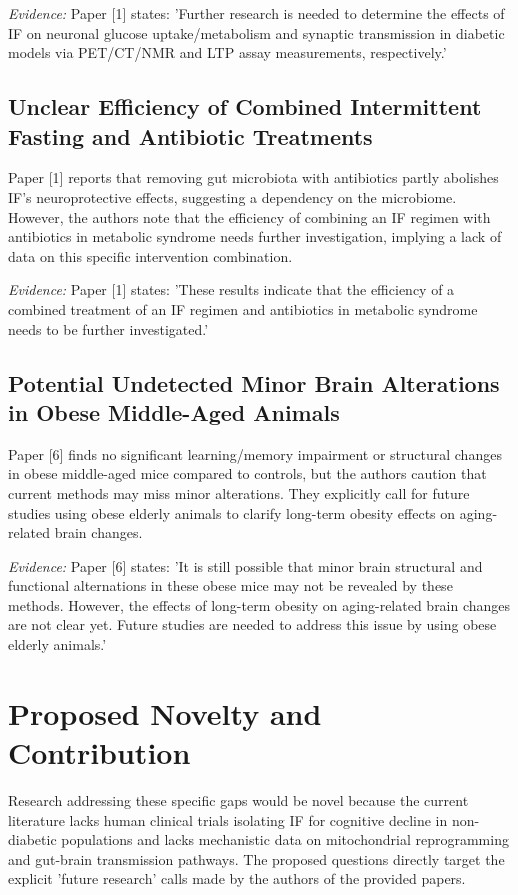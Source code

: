 \documentclass[11pt]{article}
\begin{document}
\textit{Evidence:} Paper [1] states: 'Further research is needed to determine the effects of IF on neuronal glucose uptake/metabolism and synaptic transmission in diabetic models via PET/CT/NMR and LTP assay measurements, respectively.'

\subsection{Unclear Efficiency of Combined Intermittent Fasting and Antibiotic Treatments}
Paper [1] reports that removing gut microbiota with antibiotics partly abolishes IF's neuroprotective effects, suggesting a dependency on the microbiome. However, the authors note that the efficiency of combining an IF regimen with antibiotics in metabolic syndrome needs further investigation, implying a lack of data on this specific intervention combination.

\textit{Evidence:} Paper [1] states: 'These results indicate that the efficiency of a combined treatment of an IF regimen and antibiotics in metabolic syndrome needs to be further investigated.'

\subsection{Potential Undetected Minor Brain Alterations in Obese Middle-Aged Animals}
Paper [6] finds no significant learning/memory impairment or structural changes in obese middle-aged mice compared to controls, but the authors caution that current methods may miss minor alterations. They explicitly call for future studies using obese elderly animals to clarify long-term obesity effects on aging-related brain changes.

\textit{Evidence:} Paper [6] states: 'It is still possible that minor brain structural and functional alternations in these obese mice may not be revealed by these methods. However, the effects of long-term obesity on aging-related brain changes are not clear yet. Future studies are needed to address this issue by using obese elderly animals.'

\section{Proposed Novelty and Contribution}
Research addressing these specific gaps would be novel because the current literature lacks human clinical trials isolating IF for cognitive decline in non-diabetic populations and lacks mechanistic data on mitochondrial reprogramming and gut-brain transmission pathways. The proposed questions directly target the explicit 'future research' calls made by the authors of the provided papers.
\end{document}
